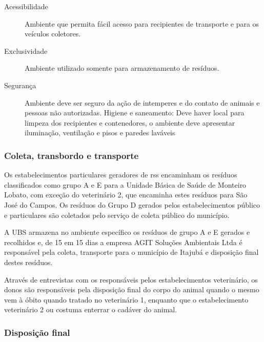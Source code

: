 	\begin{description}
		\item [Acessibilidade] Ambiente que permita fácil acesso para recipientes de transporte e para os veículos coletores.
		\item[Exclusividade] Ambiente utilizado somente para armazenamento de resíduos.
		\item[Segurança] Ambiente deve ser seguro da ação de intemperes e do contato de animais e pessoas não autorizadas.
		Higiene e saneamento: Deve haver local para limpeza dos recipientes e contenedores, o ambiente deve apresentar iluminação, ventilação e pisos e paredes laváveis
	\end{description}

	\subsubsection{Coleta, transbordo e transporte} 
	Os estabelecimentos particulares geradores de \gls{rss} encaminham os resíduos classificados como grupo A e E para a Unidade Básica de Saúde de Monteiro Lobato, com exceção do veterinário 2, que encaminha estes resíduos para São José do Campos. Os resíduos do Grupo D gerados pelos estabelecimentos público e particulares são coletados pelo serviço de coleta público do município.
	
	A UBS armazena no ambiente específico os resíduos de grupo A e E gerados e recolhidos e, de 15 em 15 dias a empresa AGIT Soluções Ambientais Ltda é responsável pela coleta, transporte para o município de Itajubá e disposição final destes resíduos.
	
	
	Através de entrevistas com os responsáveis pelos estabelecimentos veterinário, os donos são responsáveis pela disposição final do corpo do animal quando o mesmo vem à óbito quando tratado no veterinário 1, enquanto que o estabelecimento veterinário 2 ou costuma enterrar o cadáver do animal.
	
	\subsubsection{Disposição final}
	
